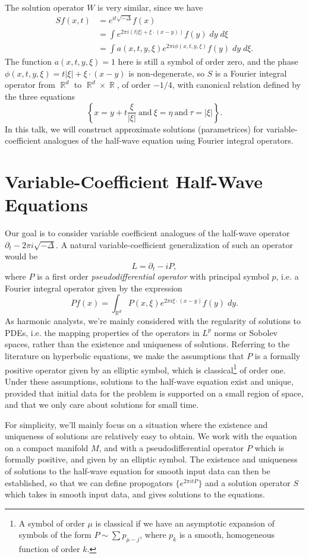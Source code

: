 \documentclass{article}
\theoremstyle{plain}
\theoremstyle{remark}
\theoremstyle{definition}
\DeclareMathOperator{\RR}{\mathbb{R}}
\begin{document}
The solution operator $W$ is very similar, since we have
%
\begin{align*}
	Sf(x,t) &= e^{it \sqrt{-\Delta}} f(x)\\
	&= \int e^{2 \pi i (t |\xi| + \xi \cdot (x - y))} f(y)\; dy\; d\xi\\
	&= \int a(x,t,y,\xi) e^{2 \pi i \phi(x,t,y,\xi)} f(y)\; dy\; d\xi.
\end{align*}
%
The function $a(x,t,y,\xi) = 1$ here is still a symbol of order zero, and the phase $\phi(x,t,y,\xi) = t |\xi| + \xi \cdot (x - y)$ is non-degenerate, so $S$ is a Fourier integral operator from $\RR^d$ to $\RR^d \times \RR$, of order $-1/4$, with canonical relation defined by the three equations
%
\[ \left\{ x = y + t \frac{\xi}{|\xi|}\ \text{and}\ \xi = \eta\ \text{and}\ \tau = |\xi| \right\}. \]
%
In this talk, we will construct approximate solutions (parametrices) for variable-coefficient analogues of the half-wave equation using Fourier integral operators.

\section{Variable-Coefficient Half-Wave Equations}

Our goal is to consider variable coefficient analogues of the half-wave operator $\partial_t - 2\pi i \sqrt{-\Delta}$. A natural variable-coefficient generalization of such an operator would be
%
\[ L = \partial_t - i P, \]
%
where $P$ is a first order \emph{pseudodifferential operator} with principal symbol $p$, i.e. a Fourier integral operator given by the expression
%
\[ Pf(x) = \int_{\RR^d} P(x,\xi) e^{2 \pi i \xi \cdot (x - y)} f(y)\; dy. \]
%
As harmonic analysts, we're mainly considered with the regularity of solutions to PDEs, i.e. the mapping properties of the operators in $L^p$ norms or Sobolev spaces, rather than the existence and uniqueness of solutions. Referring to the literature on hyperbolic equations, we make the assumptions that $P$ is a formally positive operator given by an elliptic symbol, which is classical\footnote{A symbol of order $\mu$ is classical if we have an asymptotic expansion of symbols of the form $P \sim \sum p_{\mu-j}$, where $p_k$ is a smooth, homogeneous function of order $k$.} of order one. Under these assumptions, solutions to the half-wave equation exist and unique, provided that initial data for the problem is supported on a small region of space, and that we only care about solutions for small time.

For simplicity, we'll mainly focus on a situation where the existence and uniqueness of solutions are relatively easy to obtain. We work with the equation on a compact manifold $M$, and with a pseudodifferential operator $P$ which is formally positive, and given by an elliptic symbol. The existence and uniqueness of solutions to the half-wave equation for smooth input data can then be established, so that we can define propogators $\{ e^{2 \pi i t P} \}$ and a solution operator $S$ which takes in smooth input data, and gives solutions to the equations.
\end{document}
